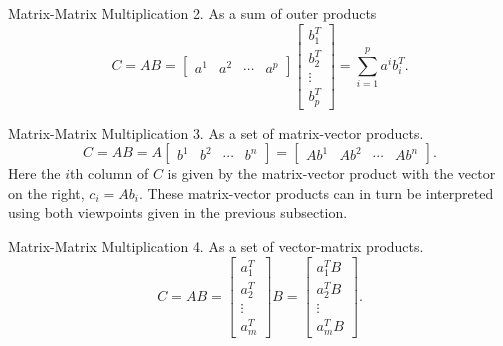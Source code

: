 \documentclass[aspectratio=169,12pt]{beamer}
\begin{document}
\begin{frame}[t]{Matrix-Matrix Multiplication}
  \vspace{0.78cm}
  {\large
  2. As a sum of outer products
  \[
    C=AB=
    \begin{bmatrix}a^1&a^2&\cdots&a^p\end{bmatrix}
    \begin{bmatrix}b_1^T\\b_2^T\\\vdots\\b_p^T\end{bmatrix}
    =\sum_{i=1}^{p}a^i b_i^T.
  \]
  }
\end{frame}

\begin{frame}[t]{Matrix-Matrix Multiplication}
  \vspace{0.18cm}
  {\small
  3. As a set of matrix-vector products.
  \begin{equation}
    C=AB=A\begin{bmatrix}b^1&b^2&\cdots&b^n\end{bmatrix}
      =\begin{bmatrix}Ab^1&Ab^2&\cdots&Ab^n\end{bmatrix}.
    \tag{2}
  \end{equation}
  \vspace{0.28cm}
  Here the $i$th column of $C$ is given by the matrix-vector product with the vector
  on the right, $c_i=Ab_i$. These matrix-vector products can in turn be interpreted
  using both viewpoints given in the previous subsection.
  }
\end{frame}

\begin{frame}[t]{Matrix-Matrix Multiplication}
  \vspace{0.82cm}
  {\large
  4. As a set of vector-matrix products.
  \[
    C=AB=
    \begin{bmatrix}a_1^T\\a_2^T\\\vdots\\a_m^T\end{bmatrix}B
    =\begin{bmatrix}a_1^TB\\a_2^TB\\\vdots\\a_m^TB\end{bmatrix}.
  \]
  }
\end{frame}
\end{document}
